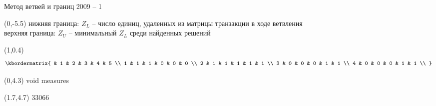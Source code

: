 \documentclass[10pt, dvipsnames]{beamer}
\begin{document}
\begin{frame}{Метод ветвей и границ 2009 -- 1}	
	\begin{textblock}{13}(0,-5.5)
нижняя граница: $Z_L$ -- число единиц, удаленных из матрицы транзакции в ходе ветвления\\[0.1cm]
верхняя граница: $Z_U$ -- минимальный $Z_L$ среди найденных решений\\[0.2cm]
	\end{textblock}
	
	\begin{textblock}{1}(1,0.4) 
\[
\small
  \kbordermatrix{
      & 1 & 2 & 3 & 4 & 5 \\
    1 & 1 & 1 & 0 & 0 & 0 \\
    2 & 1 & 1 & 1 & 1 & 1 \\
    3 & 0 & 0 & 0 & 1 & 1 \\
    4 & 0 & 0 & 0 & 1 & 1 \\
  }
\]
	\end{textblock}

	\begin{textblock}{1}(0,4.3)
\small void measures
	\end{textblock}

	\begin{textblock}{1}(1.7,4.7)
\mbox{\small\hspace{7pt}3\hspace{10pt}3\hspace{10pt}0\hspace{10pt}6\hspace{10pt}6}
	\end{textblock}


\end{frame}
\end{document}
